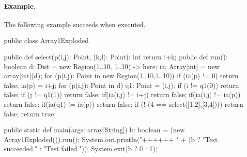 \paragraph{Example.}
The following example succeeds when executed.
\begin{xten}
public class Array1Exploded {
  public def select(p(i,j): Point, (k,l): Point): int {
      return i+k;
  }
  public def run(): boolean {
    d: Dist = new Region(1..10, 1..10) -> here;
    ia: Array[int] = new array[int](d);
    for (p(i,j): Point in new Region(1..10,1..10)) {
        if (ia(p) != 0) return false;
        ia(p) = i+j;
    }
    for (p(i,j): Point in d) {
      q1: Point = (i,j);
      if (i != q1(0)) return false;
      if (j != q1(1)) return false;
      if(ia(i,j) != i+j) return false;
      if(ia(i,j) != ia(p)) return false;
      if(ia(q1)  != ia(p)) return false;
    }
    if (! (4 == select([1,2],[3,4]))) return false;
    return true;
  }
        
  public static def main(args: array[String]) {
     b: boolean = (new Array1Exploded()).run();
     System.out.println("++++++ "
                        + (b ? "Test succeeded."
                             : "Test failed."));
     System.exit(b ? 0 : 1);
  }
}
\end{xten}



